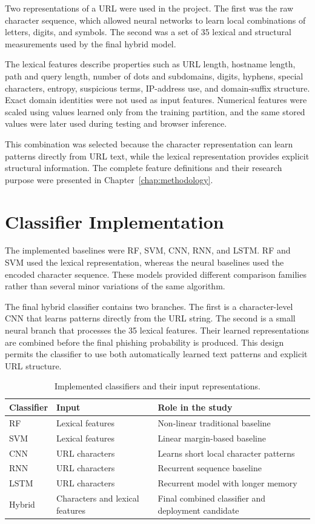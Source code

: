 Two representations of a URL were used in the project. The first was the raw
character sequence, which allowed neural networks to learn local combinations
of letters, digits, and symbols. The second was a set of 35 lexical and
structural measurements used by the final hybrid model.

The lexical features describe properties such as URL length, hostname length,
path and query length, number of dots and subdomains, digits, hyphens, special
characters, entropy, suspicious terms, IP-address use, and domain-suffix
structure. Exact domain identities were not used as input features. Numerical
features were scaled using values learned only from the training partition, and
the same stored values were later used during testing and browser inference.

This combination was selected because the character representation can learn
patterns directly from URL text, while the lexical representation provides
explicit structural information. The complete feature definitions and their
research purpose were presented in Chapter~\ref{chap:methodology}.

\section{Classifier Implementation}

The implemented baselines were RF, SVM, CNN, RNN, and LSTM. RF and SVM used
the lexical representation, whereas the neural baselines used the encoded
character sequence. These models provided different comparison families rather
than several minor variations of the same algorithm.

The final hybrid classifier contains two branches. The first is a
character-level CNN that learns patterns directly from the URL string. The
second is a small neural branch that processes the 35 lexical features. Their
learned representations are combined before the final phishing probability is
produced. This design permits the classifier to use both automatically learned
text patterns and explicit URL structure.

\begin{table}[htbp]
\centering
\caption{Implemented classifiers and their input representations.}
\label{tab:implemented-classifiers}
\small
\begin{tabular}{@{}p{}p{}p{}@{}}
\toprule
Classifier & Input & Role in the study \\
\midrule
RF & Lexical features & Non-linear traditional baseline \\
SVM & Lexical features & Linear margin-based baseline \\
CNN & URL characters & Learns short local character patterns \\
RNN & URL characters & Recurrent sequence baseline \\
LSTM & URL characters & Recurrent model with longer memory \\
Hybrid & Characters and lexical features & Final combined classifier and deployment candidate \\
\bottomrule
\end{tabular}
\end{table}

